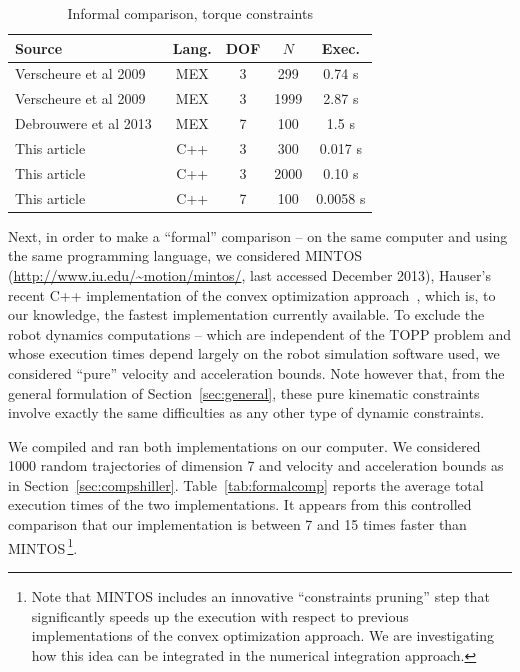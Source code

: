 \documentclass[9pt,technote]{IEEEtran}
\begin{document}
\begin{table}[th]
  \caption{Informal comparison, torque constraints}    
  \centering
    \begin{tabular}{|l|c|c|c|c|}
      \hline
      Source&Lang.&DOF&$N$&Exec.\\
      \hline      
      Verscheure et al 2009~\cite{VerX09tac}&MEX&3&299&0.74 s\\
      Verscheure et al 2009~\cite{VerX09tac}&MEX&3&1999&2.87 s\\
      Debrouwere et al 2013~\cite{DebX13tr}&MEX&7&100&1.5 s\\
      This article&C++&3&300&0.017 s\\
      This article&C++&3&2000&0.10 s\\
      This article&C++&7&100&0.0058 s\\
      \hline
     \end{tabular}
 \label{tab:informalcomp}  
\end{table}

Next, in order to make a ``formal'' comparison -- on the same computer
and using the same programming language, we considered MINTOS
(\url{http://www.iu.edu/~motion/mintos/}, last accessed December
2013), Hauser's recent C++ implementation of the convex optimization
approach~\cite{Hau13rss}, which is, to our knowledge, the fastest
implementation currently available. To exclude the robot dynamics
computations -- which are independent of the TOPP problem and whose
execution times depend largely on the robot simulation software used,
we considered ``pure'' velocity and acceleration bounds. Note however
that, from the general formulation of Section~\ref{sec:general}, these
pure kinematic constraints involve exactly the same difficulties as
any other type of dynamic constraints.

We compiled and ran both implementations on our computer. We
considered 1000 random trajectories of dimension 7 and velocity and
acceleration bounds as in
Section~\ref{sec:compshiller}. Table~\ref{tab:formalcomp} reports the
average total execution times of the two implementations. It appears
from this controlled comparison that our implementation is between 7
and 15 times faster than MINTOS\,\footnote{Note that MINTOS includes
  an innovative ``constraints pruning'' step that significantly speeds
  up the execution with respect to previous implementations of the
  convex optimization approach. We are investigating how this idea can
  be integrated in the numerical integration approach.}.
\end{document}
